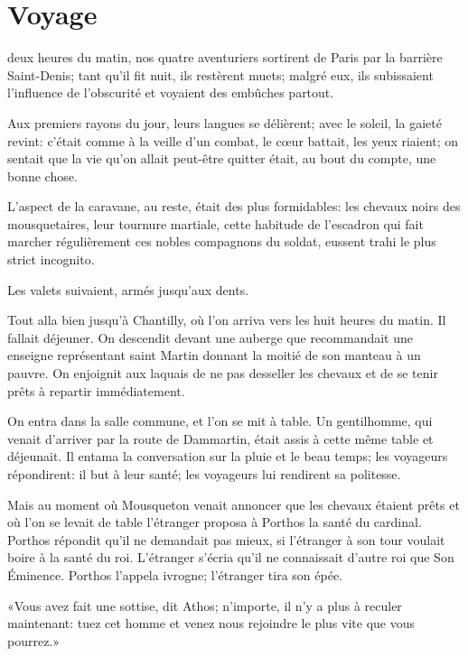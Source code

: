 
\chapter{Voyage} 
	
	\lettrine{}{} deux heures du matin, nos quatre aventuriers sortirent de Paris par la barrière Saint-Denis; tant qu'il fit nuit, ils restèrent muets; malgré eux, ils subissaient l'influence de l'obscurité et voyaient des embûches partout. 

Aux premiers rayons du jour, leurs langues se délièrent; avec le soleil, la gaieté revint: c'était comme à la veille d'un combat, le cœur battait, les yeux riaient; on sentait que la vie qu'on allait peut-être quitter était, au bout du compte, une bonne chose. 

L'aspect de la caravane, au reste, était des plus formidables: les chevaux noirs des mousquetaires, leur tournure martiale, cette habitude de l'escadron qui fait marcher régulièrement ces nobles compagnons du soldat, eussent trahi le plus strict incognito. 

Les valets suivaient, armés jusqu'aux dents. 

Tout alla bien jusqu'à Chantilly, où l'on arriva vers les huit heures du matin. Il fallait déjeuner. On descendit devant une auberge que recommandait une enseigne représentant saint Martin donnant la moitié de son manteau à un pauvre. On enjoignit aux laquais de ne pas desseller les chevaux et de se tenir prêts à repartir immédiatement. 

On entra dans la salle commune, et l'on se mit à table. Un gentilhomme, qui venait d'arriver par la route de Dammartin, était assis à cette même table et déjeunait. Il entama la conversation sur la pluie et le beau temps; les voyageurs répondirent: il but à leur santé; les voyageurs lui rendirent sa politesse. 

Mais au moment où Mousqueton venait annoncer que les chevaux étaient prêts et où l'on se levait de table l'étranger proposa à Porthos la santé du cardinal. Porthos répondit qu'il ne demandait pas mieux, si l'étranger à son tour voulait boire à la santé du roi. L'étranger s'écria qu'il ne connaissait d'autre roi que Son Éminence. Porthos l'appela ivrogne; l'étranger tira son épée. 

«Vous avez fait une sottise, dit Athos; n'importe, il n'y a plus à reculer maintenant: tuez cet homme et venez nous rejoindre le plus vite que vous pourrez.» 


